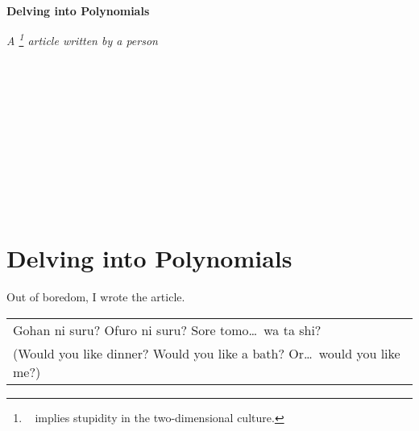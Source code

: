 \documentclass[UTF8,fontset=none,twoside,leqno,12pt,a4paper]{ctexart}
\makeatletter
\providecommand{\newsection}{}
\renewcommand{\newsection}{\cleardoublepage \thispagestyle{empty}}
\providecommand{\myFN}{}
\renewcommand{\myFN}[1]{\footnote{\sffamily \ #1}}
\theoremstyle{exer}
\theoremstyle{exer*}
\theoremstyle{remarkStyle}
\def\ellipsis{\dots}
\renewcommand{\cleardoublepage}{\relax \clearpage
    \if@twoside \ifodd\c@page\relax
        \else \thispagestyle{empty} \ \clearpage\fi\fi}
\makeatother
\begin{document}


\pagestyle{empty}

\ \

\vfill

\begin{center}
    \sffamily

    \textbf{\huge Delving into Polynomials}

    \vspace{2ex}

    \textit{\large A \myFN{\ding{200} implies stupidity in the two-dimensional culture.} article written by a  person}
\end{center}

\vfill

\ \

\vfill

\ \

\clearpage

\ \
\clearpage

\title{}
\date{}
\author{}
\pagestyle{plain}
\renewcommand{\contentsname}{Table of Contents}
\renewcommand{\abstractname}{Abstract}

\pagestyle{plain}
\thispagestyle{empty}
\tableofcontents

\newsection


\newsection


\newsection
\pagestyle{headings}
\setcounter{page}{1}

\section*{Delving into Polynomials}

Out of boredom, I wrote the article.

    {
        \vfill \itshape \sffamily \small
        \begin{center}
            \begin{tabular}{l}
                Gohan ni suru? Ofuro ni suru? Sore tomo\ellipsis \ wa ta shi? \\
                (Would you like dinner? Would you like a bath? Or\ellipsis \ would you like me?)
            \end{tabular}
        \end{center}
    }
\end{document}
